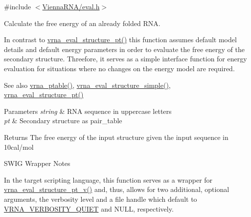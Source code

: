 {\ttfamily \#include $<$\mbox{\hyperlink{eval_8h}{Vienna\+R\+N\+A/eval.\+h}}$>$}



Calculate the free energy of an already folded R\+NA. 

In contrast to \mbox{\hyperlink{group__eval_gadbd09372ddfd7a450bbd590c96a6bfe4}{vrna\+\_\+eval\+\_\+structure\+\_\+pt()}} this function assumes default model details and default energy parameters in order to evaluate the free energy of the secondary structure. Threefore, it serves as a simple interface function for energy evaluation for situations where no changes on the energy model are required.

\begin{DoxySeeAlso}{See also}
\mbox{\hyperlink{group__struct__utils_gae829fb8bb7f694c12a9c0bbc34c77c60}{vrna\+\_\+ptable()}}, \mbox{\hyperlink{group__eval_ga7e5273464b775d4130245681312c1369}{vrna\+\_\+eval\+\_\+structure\+\_\+simple()}}, \mbox{\hyperlink{group__eval_gadbd09372ddfd7a450bbd590c96a6bfe4}{vrna\+\_\+eval\+\_\+structure\+\_\+pt()}}
\end{DoxySeeAlso}

\begin{DoxyParams}{Parameters}
{\em string} & R\+NA sequence in uppercase letters \\
\hline
{\em pt} & Secondary structure as pair\+\_\+table \\
\hline
\end{DoxyParams}
\begin{DoxyReturn}{Returns}
The free energy of the input structure given the input sequence in 10cal/mol
\end{DoxyReturn}
\begin{DoxyRefDesc}{S\+W\+I\+G Wrapper Notes}
\item[\mbox{\hyperlink{wrappers__wrappers000053}{S\+W\+I\+G Wrapper Notes}}]In the target scripting language, this function serves as a wrapper for \mbox{\hyperlink{group__eval_ga2c6533ba0afe4c88d335d8f1e0e2a48e}{vrna\+\_\+eval\+\_\+structure\+\_\+pt\+\_\+v()}} and, thus, allows for two additional, optional arguments, the verbosity level and a file handle which default to \mbox{\hyperlink{eval_8h_af4afe19780b61b4962c613bde324128b}{V\+R\+N\+A\+\_\+\+V\+E\+R\+B\+O\+S\+I\+T\+Y\+\_\+\+Q\+U\+I\+ET}} and N\+U\+LL, respectively. \end{DoxyRefDesc}
\mbox{\label{group__eval_ga76e152ee9a02be23da14cdddf52b4e44}} 
